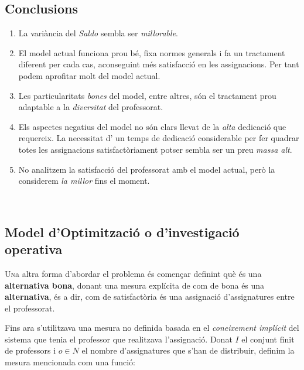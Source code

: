 \documentclass[10pt,twocolumn]{article}
\newcommand{\esp}{\text{ }}
\begin{document}
\subsection{Conclusions}
		\begin{enumerate}
		    \item La variància del \textit{Saldo} sembla ser \textit{millorable}.
			\item El model actual funciona prou bé, fixa normes generals i fa un tractament diferent per cada cas, aconseguint més satisfacció en les assignacions. Per tant podem aprofitar molt del model actual. 
			\item Les particularitats \textit{bones} del model, entre altres, són el tractament prou adaptable a la \textit{diversitat} del professorat.
			\item Els aspectes negatius del model no són clars llevat de la \textit{alta} dedicació que requereix. La necessitat d' un temps de dedicació considerable per fer quadrar totes les assignacions satisfactòriament potser sembla ser un preu \textit{massa alt}.
			\item No analitzem la satisfacció del professorat amb el model actual, però la considerem \textit{ la millor} fins el moment. 
		\end{enumerate}
\newpage
$\esp$
\newpage
\begin{tcolorbox}[colframe=white,colback=redviolet!20,sharp corners=all,size=minimal,halign=center,valign=center]
\section{Model d'Optimització o d'investigació operativa}
\end{tcolorbox}
\lettrine{U}na altra forma d'abordar el problema és començar definint què és una \textbf{alternativa bona}, donant una mesura explícita de com de bona és una \textbf{alternativa}, és a dir, com de satisfactòria és una assignació d'assignatures entre el professorat.

Fins ara s'utilitzava una mesura no definida basada en el \textit{coneixement implícit} del sistema que tenia el professor que realitzava l'assignació. Donat $I$ el conjunt finit de professors i $o \in N$ el nombre d'assignatures que s'han de distribuir, definim la mesura mencionada com una funció:
\end{document}
